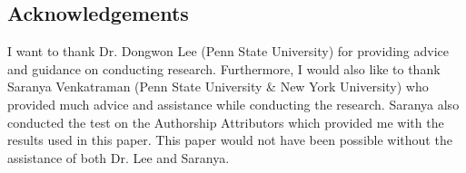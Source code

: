 \documentclass{article}
\begin{document}
\subsection{Acknowledgements}
I want to thank Dr. Dongwon Lee (Penn State University) for providing advice and guidance on conducting research. Furthermore, I would also like to thank Saranya Venkatraman (Penn State University \& New York University) who provided much advice and assistance while conducting the research. Saranya also conducted the test on the Authorship Attributors which provided me with the results used in this paper. This paper would not have been possible without the assistance of both Dr. Lee and Saranya.



\end{document}
